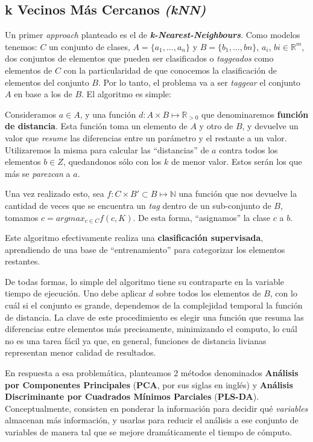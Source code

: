 \subsection{k Vecinos M\'as Cercanos \textit{(kNN)}}\label{intro_knn}

Un primer \textit{approach} planteado es el de \textit{\textbf{k-Nearest-Neighbours}}. Como modelos tenemos: $C$ un conjunto de clases, $A = \{a_{1}, ..., a_{n}\}$ y $B = \{b_{1}, ..., b{n}\}$, $a_{i}$, $b{i} \in \mathbb{R}^m$, dos conjuntos de elementos que pueden ser clasificados o \textit{taggeados} como elementos de $C$ con la particularidad de que conocemos la clasificaci\'on de elementos del conjunto $B$. Por lo tanto, el problema va a ser \textit{taggear} el conjunto $A$ en base a los de $B$. El algoritmo es simple:

Consideramos $a \in A$, y una funci\'on $d : A \times B \mapsto \mathbb{R}_{> 0}$ que denominaremos \textbf{funci\'on de distancia}. Esta funci\'on toma un elemento de $A$ y otro de $B$, y devuelve un valor que \textit{resume} las diferencias entre un par\'ametro y el restante a un valor. Utilizaremos la misma para calcular las ``distancias'' de $a$ contra todos los elementos $b \in Z$, quedandonos s\'olo con los $k$ de menor valor. Estos ser\'an los que m\'as se \textit{parezcan} a $a$.

Una vez realizado esto, sea $f : C \times B' \subset B \mapsto \mathbb{N}$ una funci\'on que nos devuelve la cantidad de veces que se encuentra un \textit{tag} dentro de un sub-conjunto de $B$, tomamos $c = argmax_{c \in C} f(c, K)$. De esta forma, ``asignamos'' la clase $c$ a $b$.

Este algoritmo efectivamente realiza una \textbf{clasificaci\'on supervisada}, aprendiendo de una base de ``entrenamiento'' para categorizar los elementos restantes.

De todas formas, lo simple del algoritmo tiene su contraparte en la variable tiempo de ejecuci\'on. Uno debe aplicar $d$ sobre todos los elementos de $B$, con lo cu\'al si el conjunto es grande, dependemos de la complejidad temporal la funci\'on de distancia. La clave de este procedimiento es elegir una funci\'on que resuma las diferencias entre elementos m\'as precisamente, minimizando el computo, lo cu\'al no es una tarea f\'acil ya que, en general, funciones de distancia livianas representan menor calidad de resultados.

En respuesta a esa problem\'atica, planteamos 2 m\'etodos denominados \textbf{An\'alisis por Componentes Principales} (\textbf{PCA}, por sus siglas en ingl\'es) y \textbf{An\'alisis Discriminante por Cuadrados M\'inimos Parciales} (\textbf{PLS-DA}). Conceptualmente, consisten en ponderar la informaci\'on para decidir qu\'e \textit{variables} almacenan m\'as informaci\'on, y usarlas para reducir el an\'alisis a ese conjunto de variables de manera tal que se mejore dram\'aticamente el tiempo de c\'omputo.

